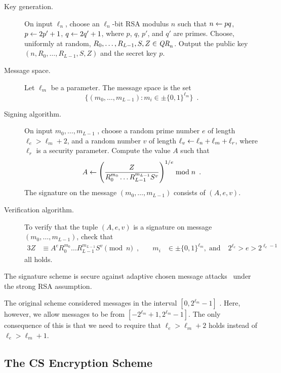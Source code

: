 \begin{description}
\item[Key generation.]
	On input $\ell_n$, choose an $\ell_n$-bit RSA modulus $n$  such that $n\gets pq$,
	$p\gets 2p'+1$, $q\gets 2q'+1$, where $p$, $q$, $p'$, and $q'$ are primes.
	Choose, uniformly at random, $R_0,\ldots,R_{L-1},S,Z \in \textit{QR}_{n}$.
	Output the public key $(n,R_0,\ldots,R_{L-1},S,Z)$ and the secret key $p$. 

\item[Message space.]
	Let $\ell_m$ be a parameter.  
	The message space is the set \[
	\{(m_0,\ldots,m_{L-1}) : m_i \in \pm\{0,1\}^{\ell_m}\}\enspace.
	\]

\item[Signing algorithm.]
	On input $m_0,\ldots,m_{L-1}$ , 
	choose a random prime number $e$ of length 
	$\ell_e > \ell_m + 2$,
	and a random number $v$ of length $\ell_v \gets \ell_n + \ell_m + \ell_r$,
	where $\ell_r$ is a security parameter.  
	Compute the value $A$ such 
	that 
	\[
	A \gets \left(\frac{Z}{ R_0^{m_0}\ldots R_{L-1}^{m_{L-1}}S^v}\right)^{1/e}  \bmod{n}\enspace.
	\]
	The signature on the message  $(m_0,\ldots,m_{L-1})$ consists of $(A,e,v)$.
\item[Verification algorithm.]
	To verify that the tuple $(A,e,v)$ is a signature on message $(m_0,\ldots,m_{L-1}) $,
	check that 
	\begin{alignat*}{3}
	Z &\equiv A^e R_0^{m_0}\ldots R_{L-1}^{m_{L-1}}S^v\pmod{n}\enspace, 
	\quad &
	m_i &\in \pm \{0,1\}^{\ell_m}, 
	\;
	\text{and} \; 
	& 2^{\ell_e}> e > 2^{\ell_e-1}
	\end{alignat*}
	all holds.
\end{description}

\begin{theorem}
The signature scheme is secure against adaptive chosen message attacks~\cite{gomiri88} 
under the strong RSA assumption.
\end{theorem}

The original scheme considered messages in the interval $[0,2^{\ell_m}-1]$ .
Here, however, we allow messages to be from $[-2^{\ell_m}+1,2^{\ell_m}-1]$.
The only consequence of this is that we need to require that $\ell_e > \ell_m +2$ holds 
instead of  $\ell_e > \ell_m +1$.


\subsection{The CS Encryption Scheme}

